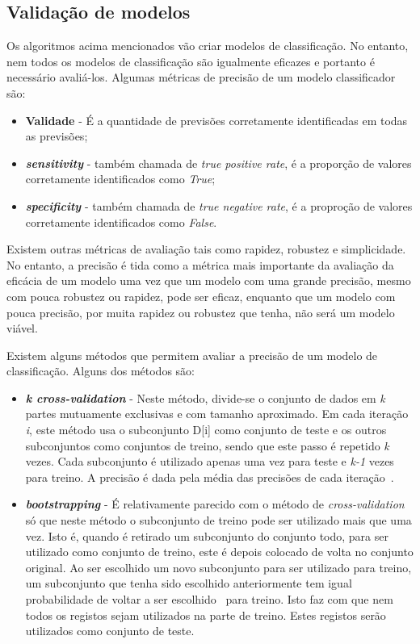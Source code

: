 \subsection{Validação de modelos}

Os algoritmos acima mencionados vão criar modelos de classificação. No entanto, nem todos os modelos de classificação são igualmente eficazes e portanto é necessário avaliá-los. Algumas métricas de precisão de um modelo classificador são:

\begin{itemize}
\item{\textbf{Validade}} - É a quantidade de previsões corretamente identificadas em todas as previsões;
\item{\textbf{\textit{sensitivity}}} - também chamada de \textit{true positive rate}, é a proporção de valores corretamente identificados como \textit{True};
\item{\textbf{\textit{specificity}}} - também chamada de \textit{true negative rate}, é a proproção de valores corretamente identificados como \textit{False}.
\end{itemize}
Existem outras métricas de avaliação tais como rapidez, robustez e simplicidade. No entanto, a precisão é tida como a métrica mais importante da avaliação da eficácia de um modelo uma vez que um modelo com uma grande precisão, mesmo com pouca robustez ou rapidez, pode ser eficaz, enquanto que um modelo com pouca precisão, por muita rapidez ou robustez que tenha, não será um modelo viável.

Existem alguns métodos que permitem avaliar a precisão de um modelo de classificação. Alguns dos métodos são:

\begin{itemize}

\item \textbf{\textit{k cross-validation}} - Neste método, divide-se o conjunto de dados em \textit{k} partes mutuamente exclusivas e com tamanho aproximado. Em cada iteração \textit{i}, este método usa o subconjunto D[i] como conjunto de teste e os outros subconjuntos como conjuntos de treino, sendo que este passo é repetido \textit{k} vezes. Cada subconjunto é utilizado apenas uma vez para teste e \textit{k-1} vezes para treino. A precisão é dada pela média das precisões de cada iteração~\cite{svm}.  

\item \textbf{\textit{bootstrapping}} - É relativamente parecido com o método de \textit{cross-validation} só que neste método o subconjunto de treino pode ser utilizado mais que uma vez. Isto é, quando é retirado um subconjunto do conjunto todo, para ser utilizado como conjunto de treino, este é depois colocado de volta no conjunto original. Ao ser escolhido um novo subconjunto para ser utilizado para treino, um subconjunto que tenha sido escolhido anteriormente tem igual probabilidade de voltar a ser escolhido~\cite{bootstrap} para treino. Isto faz com que nem todos os registos sejam utilizados na parte de treino. Estes registos serão utilizados como conjunto de teste.

\end{itemize}

